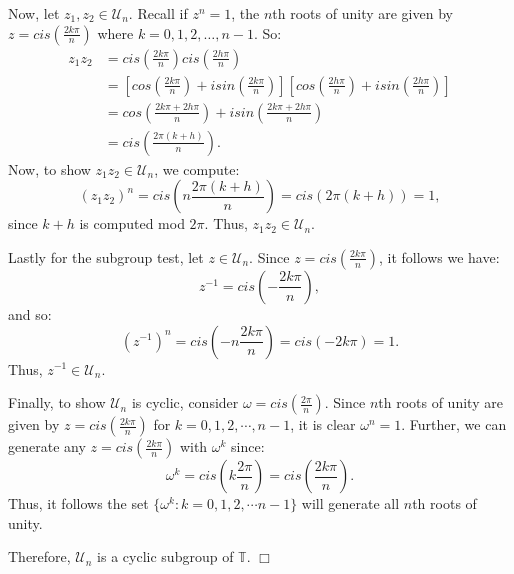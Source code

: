 \documentclass[11pt, a4paper]{article}
\begin{document}
Now, let $z_1, z_2 \in \mathcal{U}_{n}$. Recall if $z^n = 1$, the $n$th roots of unity are given by $z = cis \left ( \frac{2k\pi}{n} \right )$ where $k = 0, 1, 2, \dots, n - 1$. So:
\begin{align*}
  z_1 z_2 &= cis \left ( \frac{2k\pi}{n} \right ) cis \left ( \frac{2h\pi}{n} \right ) \\
          &= \left [cos \left ( \frac{2k\pi}{n}\right ) + isin \left ( \frac{2k\pi}{n} \right ) \right ] \left [cos \left ( \frac{2h\pi}{n}\right ) + isin \left ( \frac{2h\pi}{n} \right ) \right ] \\
          &= cos \left ( \frac{2k\pi + 2h\pi}{n} \right ) + isin \left ( \frac{2k\pi + 2h\pi}{n} \right ) \\
          &= cis \left ( \frac{2\pi(k + h)}{n} \right ).
\end{align*}
Now, to show $z_1 z_2 \in \mathcal{U}_{n}$, we compute:
\[
  (z_1 z_2)^n = cis \left (n \frac{2\pi(k + h)}{n} \right ) = cis (2\pi(k + h)) = 1,
\]
since $k + h$ is computed mod $2\pi$. Thus, $z_1 z_2 \in \mathcal{U}_{n}$.

Lastly for the subgroup test, let $z \in \mathcal{U}_{n}$. Since $z = cis \left ( \frac{2k\pi}{n} \right )$, it follows we have:
\[
  z^{-1} = cis \left (- \frac{2k\pi}{n} \right ),
\]
and so:
\[
  (z^{-1})^n = cis \left (-n \frac{2k\pi}{n} \right ) = cis(-2k\pi) = 1.
\]
Thus, $z^{-1} \in \mathcal{U}_{n}$.

Finally, to show $\mathcal{U}_{n}$ is cyclic, consider $\omega = cis \left ( \frac{2\pi}{n} \right )$. Since $n$th roots of unity are given by $z = cis \left ( \frac{2k\pi}{n} \right )$ for $k = 0, 1, 2, \cdots, n - 1$, it is clear $\omega^n = 1$. Further, we can generate any $z = cis \left ( \frac{2k\pi}{n} \right )$ with $\omega^k$ since:
\[
  \omega^k = cis \left (k \frac{2\pi}{n} \right ) = cis \left ( \frac{2k\pi}{n} \right ).
\]
Thus, it follows the set $\{\omega^k : k = 0, 1, 2, \cdots n - 1\}$ will generate all $n$th roots of unity.

Therefore, $\mathcal{U}_{n}$ is a cyclic subgroup of $\mathbb{T}$. $\Box$

\newpage
\end{document}
